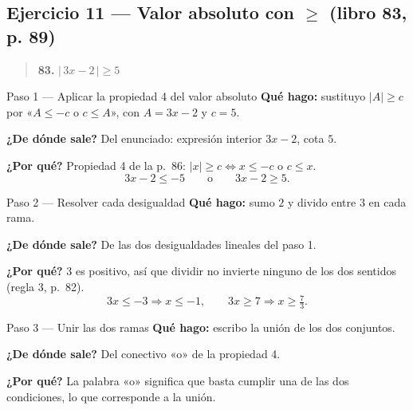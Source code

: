 \documentclass[11pt]{article}
\begin{document}
\subsection*{Ejercicio 11 --- Valor absoluto con $\ge$ (libro 83, p. 89)}

\begin{quote}
\textbf{83.} $|\,3x-2\,|\ge 5$
\end{quote}

\begin{paso}{Paso 1 --- Aplicar la propiedad 4 del valor absoluto}
\textbf{Qué hago:} sustituyo $|A|\ge c$ por «$A\le -c$ o $c\le A$», con $A=3x-2$ y $c=5$.

\textbf{¿De dónde sale?} Del enunciado: expresión interior $3x-2$, cota $5$.

\textbf{¿Por qué?} Propiedad 4 de la p.~86: $|x|\ge c \iff x\le -c$ o $c\le x$.
\[
3x-2\le -5 \qquad \text{o} \qquad 3x-2\ge 5.
\]
\end{paso}

\begin{paso}{Paso 2 --- Resolver cada desigualdad}
\textbf{Qué hago:} sumo $2$ y divido entre $3$ en cada rama.

\textbf{¿De dónde sale?} De las dos desigualdades lineales del paso 1.

\textbf{¿Por qué?} $3$ es positivo, así que dividir no invierte ninguno de los dos sentidos (regla 3, p.~82).
\[
3x\le -3 \Rightarrow x\le -1,
\qquad
3x\ge 7 \Rightarrow x\ge \tfrac73.
\]
\end{paso}

\begin{paso}{Paso 3 --- Unir las dos ramas}
\textbf{Qué hago:} escribo la unión de los dos conjuntos.

\textbf{¿De dónde sale?} Del conectivo «o» de la propiedad 4.

\textbf{¿Por qué?} La palabra «o» significa que basta cumplir una de las dos condiciones, lo que corresponde a la unión.
\end{paso}

\begin{center}
\end{center}
\end{document}
